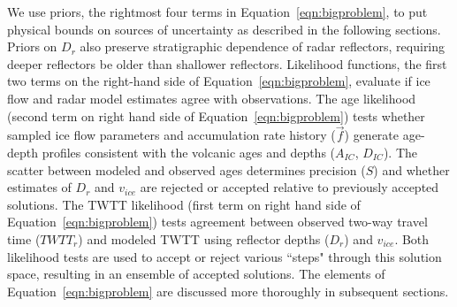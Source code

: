 We use priors, the rightmost four terms in Equation~\ref{eqn:bigproblem}, to put physical bounds on sources of uncertainty as described in the following sections. Priors on ${D_r}$ also preserve stratigraphic dependence of radar reflectors, requiring deeper reflectors be older than shallower reflectors. Likelihood functions, the first two terms on the right-hand side of Equation~\ref{eqn:bigproblem}, evaluate if ice flow and radar model estimates agree with observations. The age likelihood (second term on right hand side of Equation~\ref{eqn:bigproblem}) tests whether sampled ice flow parameters and accumulation rate history ($\vec{f}$) generate age-depth profiles consistent with the volcanic ages and depths ($A_{IC}$, $D_{IC}$). The scatter between modeled and observed ages determines precision ($S$) and whether estimates of $D_r$ and $v_{ice}$ are rejected or accepted relative to previously accepted solutions. The TWTT likelihood (first term on right hand side of Equation~\ref{eqn:bigproblem}) tests %
agreement between observed two-way travel time ($TWTT_r$) and modeled TWTT using reflector depths ($D_r$) and $v_{ice}$. Both likelihood tests are used to accept or reject various ``steps" through this solution space, resulting in an ensemble of accepted solutions. %
The elements of Equation~\ref{eqn:bigproblem} are discussed more thoroughly in subsequent sections. %

